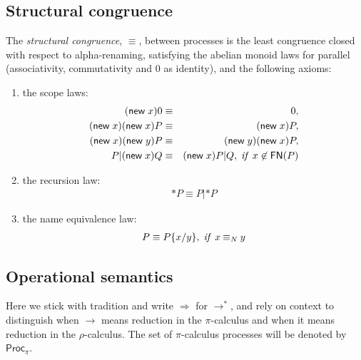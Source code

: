 \documentclass{llncs}
\newcommand{\pic}{$\pi$-calculus}
\newcommand{\pzero}{\mathbin{0}}
\newcommand{\scong}{\mathbin{\equiv}}
\newcommand{\nameeq}{\mathbin{\equiv_N}}
\newcommand{\freenames}[1]{\mathbin{\mathsf{FN}(#1)}}
\newcommand{\substn}[2]{\{ #1 / #2 \}}
\newcommand{\Proc}{\mathsf{Proc}}
\newcommand{\red}{\rightarrow}
\newcommand{\wred}{\Rightarrow}
\newcommand{\rhoc}{$\rho$-calculus}
\begin{document}
\subsection{Structural congruence}

\begin{definition}
The {\em structural congruence}, $\equiv$, between processes is 
the least congruence closed with respect to
alpha-renaming, satisfying the abelian monoid laws for 
parallel (associativity, commutativity and $\pzero$ 
as identity), and the following axioms:
\begin{enumerate}
\item the scope laws:
\begin{eqnarray*}
 (\mathsf{new}\;x)\pzero & \equiv & \pzero, \\
 (\mathsf{new}\;x)(\mathsf{new}\;x)P & \equiv & (\mathsf{new}\;x)P, \\
 (\mathsf{new}\;x)(\mathsf{new}\;y)P & \equiv & (\mathsf{new}\;y)(\mathsf{new}\;x)P, \\
 P|(\mathsf{new}\;x)Q & \equiv & (\mathsf{new}\;x)P|Q, \; \mbox{\textit{if} }x \not\in \freenames{P} 
\end{eqnarray*}
\item
the recursion law:
\begin{eqnarray*}
 \mathsf{*}P \equiv P|\mathsf{*}P
\end{eqnarray*}
\item
the name equivalence law:
\begin{eqnarray*}
 P \equiv P \substn{x}{y}, \; \mbox{\textit{if} }x \nameeq y
\end{eqnarray*}
\end{enumerate}
\end{definition}

\subsection{Operational semantics} 



Here we stick with tradition and write $\wred$ for $\red^*$, and rely
on context to distinguish when $\red$ means reduction in the {\pic}
and when it means reduction in the {\rhoc}. The set of {\pic}
processes will be denoted by $\Proc_{\pi}$.
\end{document}
